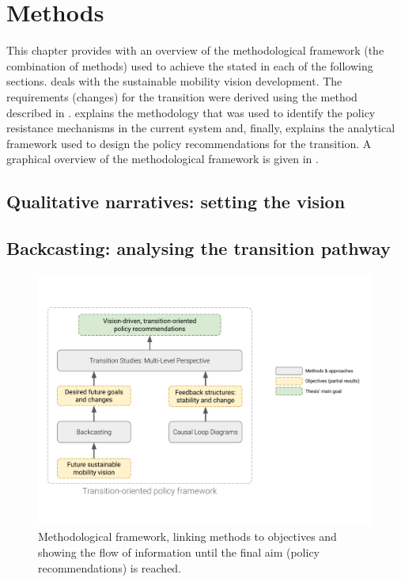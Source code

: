 \chapter{Methods}
\label{c:methods}

This chapter provides with an overview of the methodological framework (the combination of methods) used to achieve the stated  in each of the following sections.  deals with the sustainable mobility vision development. The requirements (changes) for the transition were derived using the method described in .  explains the methodology that was used to identify the policy resistance mechanisms in the current system and, finally,  explains the analytical framework used to design the policy recommendations for the transition. A graphical overview of the methodological framework is given in .

\section[Qualitative narratives]{Qualitative narratives: setting the vision}
\label{s:methods:vision}


\section[Backcasting]{Backcasting: analysing the transition pathway}
\label{s:methods:backcasting}


\begin{figure}
\centering
\includegraphics[width=0.7\linewidth,trim=0 1cm 0 1cm,clip]{figures/methods-goals.pdf}
\caption[Methodological framework]{Methodological framework, linking methods to objectives and showing the flow of information until the final aim (policy recommendations) is reached.}
\label{f:thesis-aim-methods}
\end{figure}


